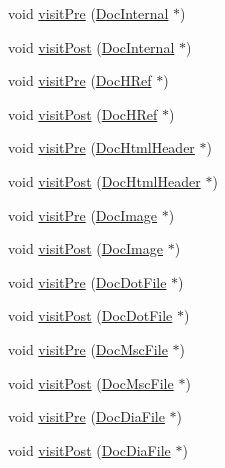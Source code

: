 \begin{DoxyCompactItemize}
void \hyperlink{class_text_doc_visitor_ad7a869b993860766b63eb1d9a1786bb5}{visit\+Pre} (\hyperlink{class_doc_internal}{Doc\+Internal} $\ast$)
\item 
void \hyperlink{class_text_doc_visitor_a5e892142ea560756efb4457337244f97}{visit\+Post} (\hyperlink{class_doc_internal}{Doc\+Internal} $\ast$)
\item 
void \hyperlink{class_text_doc_visitor_af8e6b02befc13e713c99ce72391be73b}{visit\+Pre} (\hyperlink{class_doc_h_ref}{Doc\+H\+Ref} $\ast$)
\item 
void \hyperlink{class_text_doc_visitor_a4e0bdab10ba8a3b232604a3f4f11cb50}{visit\+Post} (\hyperlink{class_doc_h_ref}{Doc\+H\+Ref} $\ast$)
\item 
void \hyperlink{class_text_doc_visitor_ab70d9dcdad33ce3f38afbda532ba7ee4}{visit\+Pre} (\hyperlink{class_doc_html_header}{Doc\+Html\+Header} $\ast$)
\item 
void \hyperlink{class_text_doc_visitor_acba27c91f3724e7a9240a6a6d0159f79}{visit\+Post} (\hyperlink{class_doc_html_header}{Doc\+Html\+Header} $\ast$)
\item 
void \hyperlink{class_text_doc_visitor_a4e5b35b2c08e0ad98118ff69c7c34d23}{visit\+Pre} (\hyperlink{class_doc_image}{Doc\+Image} $\ast$)
\item 
void \hyperlink{class_text_doc_visitor_a4772c156d1bf67613f2d5c02a017d3fb}{visit\+Post} (\hyperlink{class_doc_image}{Doc\+Image} $\ast$)
\item 
void \hyperlink{class_text_doc_visitor_a2a4627cde2c987f98504d6703197cb1a}{visit\+Pre} (\hyperlink{class_doc_dot_file}{Doc\+Dot\+File} $\ast$)
\item 
void \hyperlink{class_text_doc_visitor_a3a5a26c8b3374cc1e62d5aec27a043b2}{visit\+Post} (\hyperlink{class_doc_dot_file}{Doc\+Dot\+File} $\ast$)
\item 
void \hyperlink{class_text_doc_visitor_a3ea66bb3a2ed4eaeead0f33e0442be96}{visit\+Pre} (\hyperlink{class_doc_msc_file}{Doc\+Msc\+File} $\ast$)
\item 
void \hyperlink{class_text_doc_visitor_ad78bcdd484d0f9c67f073c7462254f45}{visit\+Post} (\hyperlink{class_doc_msc_file}{Doc\+Msc\+File} $\ast$)
\item 
void \hyperlink{class_text_doc_visitor_a8e9bb007bbba4812c77f090fe2d7b8ee}{visit\+Pre} (\hyperlink{class_doc_dia_file}{Doc\+Dia\+File} $\ast$)
\item 
void \hyperlink{class_text_doc_visitor_adce279f42599045b33e8dd26650ded8c}{visit\+Post} (\hyperlink{class_doc_dia_file}{Doc\+Dia\+File} $\ast$)
\item 

\end{DoxyCompactItemize}
